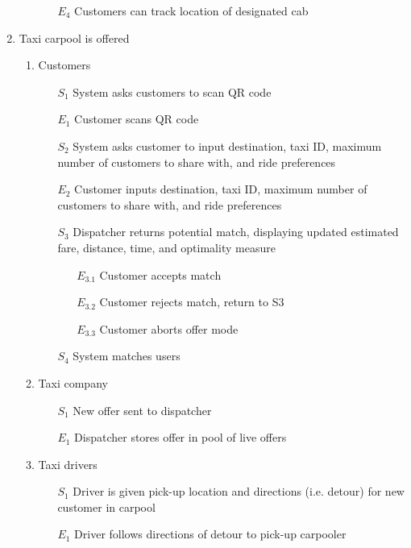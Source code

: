 \documentclass[]{article}
\begin{document}
\begin{enumerate}[{\textbf{BE}}1.]
\begin{enumerate}[{VP3}.1]
\begin{enumerate}
                \item[$E_4$] Customers can track location of designated cab
            \end{enumerate}
    \end{enumerate}
    \item Taxi carpool is offered
    \begin{enumerate}[{VP4}.1]
        \item Customers
            \begin{enumerate}
                \item[$S_1$] System asks customers to scan QR code
                \item[$E_1$] Customer scans QR code
                \item[$S_2$] System asks customer to input destination, taxi ID, maximum number of customers to share with, and ride preferences
                \item[$E_2$] Customer inputs destination, taxi ID, maximum number of customers to share with, and ride preferences
                \item[$S_3$] Dispatcher returns potential match, displaying updated estimated fare, distance, time, and optimality measure
                \begin{enumerate}
                    \item[$E_{3.1}$] Customer accepts match
                    \item[$E_{3.2}$] Customer rejects match, return to S3
                    \item[$E_{3.3}$] Customer aborts offer mode
                \end{enumerate}
                \item[$S_4$] System matches users
            \end{enumerate}
        \item Taxi company
            \begin{enumerate}
                \item[$S_1$] New offer sent to dispatcher
                \item[$E_1$] Dispatcher stores offer in pool of live offers
            \end{enumerate}
        \item Taxi drivers
            \begin{enumerate}
                \item[$S_1$] Driver is given pick-up location and directions (i.e. detour) for new customer in carpool
                \item[$E_1$] Driver follows directions of detour to pick-up carpooler

\end{enumerate}
\end{enumerate}
\end{enumerate}
\end{document}
